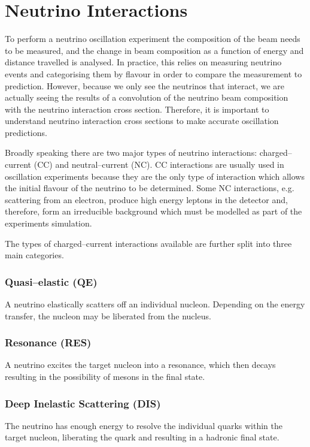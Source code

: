 \section{Neutrino Interactions} \label{nu_prod}

To perform a neutrino oscillation experiment the composition of the beam needs
to be measured, and the change in beam composition as a function of energy and
distance travelled is analysed. In practice, this relies on measuring
neutrino events and categorising them by flavour in order to compare the
measurement to prediction. However, because we only see the neutrinos that
interact, we are actually seeing the results of a convolution of the neutrino
beam composition with the neutrino interaction cross section. Therefore, it is
important to understand neutrino interaction cross sections to make accurate 
oscillation predictions.

Broadly speaking there are two major types of neutrino interactions:
charged--current (CC) and neutral--current (NC). CC interactions are usually 
used in oscillation experiments because they are the only type of interaction 
which allows the initial flavour of the neutrino to be determined. Some 
NC interactions, e.g. scattering from an electron, produce high energy leptons 
in the detector and, therefore, form an irreducible background which must 
be modelled as part of the experiments simulation.

The types of charged--current interactions available are further split into 
three main categories.

\subsubsection*{Quasi--elastic (QE)}
A neutrino elastically scatters off an individual nucleon. Depending on the
energy transfer, the nucleon may be liberated from the nucleus.
\subsubsection*{Resonance (RES)}
A neutrino excites the target nucleon into a resonance, which then decays
resulting in the possibility of mesons in the final state.
\subsubsection*{Deep Inelastic Scattering (DIS)}
The neutrino has enough energy to resolve the individual quarks within the
target nucleon, liberating the quark and resulting in a hadronic final state.

